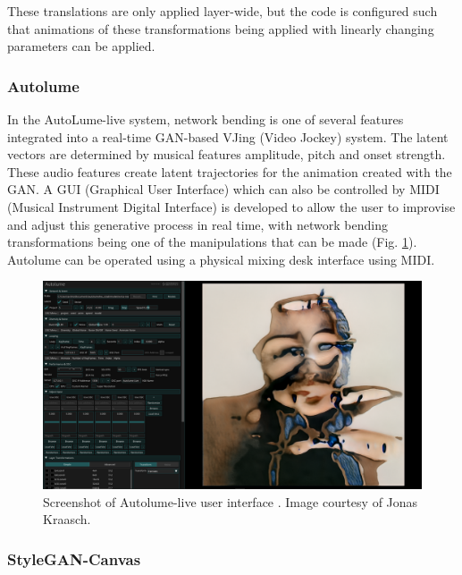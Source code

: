 These translations are only applied layer-wide, but the code is configured such that animations of these transformations being applied with linearly changing parameters can be applied. 

\subsubsection{Autolume}

In the AutoLume-live system, \citep{kraasch2022autolume,kraasch2023autolume} network bending is one of several features integrated into a real-time GAN-based VJing (Video Jockey) system. 
The latent vectors are determined by musical features amplitude, pitch and onset strength. 
These audio features create latent trajectories for the animation created with the GAN. 
A GUI (Graphical User Interface) which can also be controlled by MIDI (Musical Instrument Digital Interface) is developed to allow the user to improvise and adjust this generative process in real time, with network bending transformations being one of the manipulations that can be made  (Fig. \ref{fig:c7:autolume-live}). 
Autolume can be operated using a physical mixing desk interface using MIDI.

\begin{figure}[!htb]
    \centering
    \captionsetup{justification=centering}
    \includegraphics[width=1\textwidth]{figures/c7_impact/net-bend-technical/autolume-live.png}
    \caption[Autolume-live user interface]{Screenshot of Autolume-live user interface \citep{kraasch2023autolume}. Image courtesy of Jonas Kraasch.}
    \label{fig:c7:autolume-live}
\end{figure}

\subsubsection{StyleGAN-Canvas}


